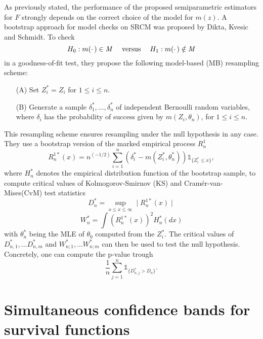 As previously stated, the performance of the proposed semiparametric estimators for $F$ strongly depends on the correct choice of the model for $m(z)$. A bootstrap approach for model checks on SRCM was proposed by Dikta, Kvesic and Schmidt\cite{PAPER4}. To check
\[
H_0: m(\cdotp) \in \mathit{M} \text{\hspace{3ex}versus\hspace{3ex}} H_1:  m(\cdotp) \notin \mathit{M}
\] 
in a goodness-of-fit test, they propose the following model-based (MB) resampling scheme:
\begin{resampling_scheme}
\begin{itemize}
\item[(A)] Set $Z_i^* = Z_i$ for $1 \leq i \leq n$.
\item[(B)] Generate a sample $\delta_1^*,\ldots,\delta_n^*$ of independent Bernoulli random variables, where $\delta_i$ has the probability of success given by $m(Z_i,\theta_n)$, for $1 \leq i \leq n$.
\end{itemize}
\end{resampling_scheme}
This resampling scheme ensures resampling under the null hypothesis in any case.
They use a bootstrap version of the marked empirical process $R_n^1$ 
\[
R_n^{1*}(x) = n^{(-1/2)}\sum_{i=1}^n\left( \delta_i^* - m(Z_i^*,\theta_n^*)\right) \mathbb{1}_{\{Z_i^*\leq x\}}, 
\]
where $H_n^*$ denotes the empirical distribution function of the bootstrap sample,
to compute critical values of Kolmogorov-Smirnov (KS) and Cramér-van-Mises(CvM) test statistics
\[
D_n^* = \sup_{o\leq x \leq \infty} \mid R_n^{1*}(x)\mid
\]
\[
W_n^*  = \int (R_n^{1*}(x))^2 H_n^*(dx)
\]
with $\theta_n^*$ being the MLE of $\theta_0$ computed from the $Z_i^*$.
The critical values of $D_{n,1}^*,\ldots D_{n,m}^*$ and $W_{n;1}^*,\ldots W_{n;m}^*$ can then be used to test the null hypothesis. Concretely, one can compute the p-value trough 
\[
\frac{1}{n} \sum_{j=1}^n \mathbb{1}_{\{D_{n,j}^*>D_n\}}.
\]

\section{Simultaneous confidence bands for survival functions}